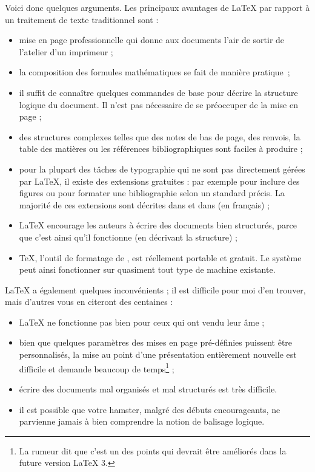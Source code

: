 \medskip Voici donc quelques arguments. Les principaux avantages de
\LaTeX{} par rapport à un traitement de texte traditionnel sont :

\begin{itemize}

\item mise en page professionnelle qui donne aux documents l'air de
      sortir de l'atelier d'un imprimeur ;
\item la composition des formules mathématiques se fait de manière
      pratique~;
\item il suffit de connaître quelques commandes de
      base pour décrire la structure logique du document.
      Il n'est pas nécessaire de se préoccuper de la mise en page ;
\item des structures complexes telles que des notes de bas de page,
      des renvois, la table des matières ou les références
      bibliographiques sont faciles à produire ;
\item pour la plupart des tâches de typographie qui ne sont pas
      directement gérées par \LaTeX{}, il existe des extensions
      gratuites : par exemple pour inclure des figures
      \PSi{} ou pour formater une bibliographie selon un
      standard précis. La majorité de ces extensions sont décrites dans
      \companion{} et dans \desgraupes{} (en français) ;
\item \LaTeX{} encourage les auteurs à écrire des documents bien
      structurés, parce que c'est ainsi qu'il fonctionne (en
      décrivant la structure) ;
\item \TeX{}, l'outil de formatage de \LaTeXe{}, est réellement
      portable et gratuit. Le système peut ainsi fonctionner sur
      quasiment tout type de machine existante.
%
%
\end{itemize}

\medskip

\LaTeX{} a également quelques inconvénients ; il est difficile
pour moi d'en trouver, mais d'autres vous en citeront des centaines  :

\begin{itemize}
\item \LaTeX{} ne fonctionne pas bien pour ceux qui ont vendu leur
      âme ;
\item bien que quelques paramètres des mises en page pré-définies
      puissent être personnalisés, la mise au point d'une présentation
      entièrement nouvelle est difficile et demande beaucoup de
      temps\footnote{La rumeur dit que c'est un des points qui
      devrait être améliorés dans la future version \LaTeX
      3.} ;
\item écrire des documents mal organisés et mal structurés est très
      difficile.
\item il est possible que votre hamster, malgré des débuts encourageants, ne
      parvienne jamais à bien comprendre la notion de balisage logique.
 \end{itemize}

